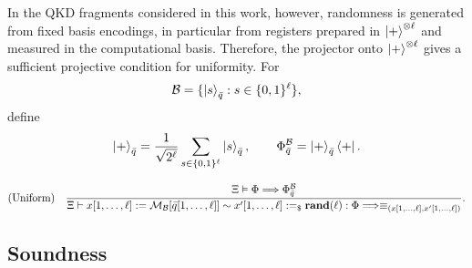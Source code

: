\documentclass[acmsmall,screen,review,anonymous,nonacm]{acmart}
\theoremstyle{defn_style}
\begin{document}
In the QKD fragments considered in this work, however, randomness is generated
from fixed basis encodings, in particular from registers prepared in
\(\ket{+}^{\otimes \ell}\) and measured in the computational basis. Therefore,
the projector onto \(\ket{+}^{\otimes \ell}\) gives a sufficient projective
condition for uniformity. For
\[
\mathcal B=
\{\ket{s}_{\bar q}:s\in\{0,1\}^{\ell}\},
\]
define
\[
\ket +_{\bar q}
=
\frac{1}{\sqrt{2^\ell}}
\sum_{s\in\{0,1\}^{\ell}}
\ket s_{\bar q},
\qquad
\Phi_{\bar q}^{\mathcal B}
=
\ket +_{\bar q}\bra +.
\]

\[
\text{\rm (Uniform)}
\quad
\frac{
\Xi
\vDash
\Phi
\Longrightarrow
\Phi_{\bar q}^{\mathcal B}
}{
\Xi
\vdash
x[1,\ldots,\ell]
:=
\mathcal M_{\mathcal B}[\bar q[1,\ldots,\ell]]
\sim
x'[1,\ldots,\ell]
:=_{\$}
\mathbf{rand}(\ell)
:
\Phi
\Longrightarrow
\equiv_{(x[1,\ldots,\ell],x'[1,\ldots,\ell])}
}.
\]


\subsection{Soundness}
\end{document}
